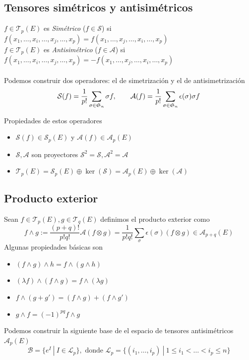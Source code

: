 \documentclass{myclass}
\newcommand{\T}{\mathcal{T}}
\newcommand{\A}{\mathcal{A}}
\renewcommand{\S}{\mathcal{S}}
\newcommand{\st}{\ | \ }
\renewcommand{\A}{\mathcal{A}}
\begin{document}
\subsection{Tensores simétricos y antisimétricos}
$f\in\T_p(E)$ es \textit{Simétrico} ($f\in \S$) si $f(x_1, \ldots, x_i, \ldots, x_j, \ldots, x_p) = f(x_1, \ldots, x_j, \ldots, x_i, \ldots, x_p)$ \\
$f\in\T_p(E)$ es \textit{Antisimétrico} ($f\in \A$) si $f(x_1, \ldots, x_i, \ldots, x_j, \ldots, x_p) = -f(x_1, \ldots, x_j, \ldots, x_i, \ldots, x_p)$ \\
\\
Podemos construir dos operadores: el de simetrización y el de antisimetrización
$$
\S(f) = \frac{1}{p!} \sum_{\sigma \in \frak{S}_n} \sigma f, \qquad \A(f) = \frac{1}{p!} \sum_{\sigma \in \frak{S}_n} \epsilon(\sigma)\sigma f
$$

Propiedades de estos operadores
\begin{itemize}
    \item $\S(f)\in \S_p(E)$ y $\A(f)\in \A_p(E)$
    \item $\S, \A$ son proyectores $\S^2=\S,  \A^2=\A$
    \item $\T_p(E)=\S_p(E)\oplus \ker(\S) = \A_p(E)\oplus \ker(\A)$
\end{itemize}

\subsection{Producto exterior}
Sean $f\in\T_p(E), g\in \T_q(E) $ definimos el producto exterior como
$$
f\wedge g := \frac{(p+q)!}{p!q!}\A(f\otimes g) = \frac{1}{p!q!}\sum_\sigma \epsilon(\sigma)(f\otimes g) \in \A_{p+q}(E)
$$
Algunas propiedades básicas son
\begin{itemize}
    \item $(f\wedge g)\wedge h=f\wedge(g\wedge h)$
    \item $(\lambda f)\wedge(f\wedge g) = f\wedge(\lambda g)$
    \item $f\wedge(g+g') = (f\wedge g) + (f\wedge g')$
    \item $g\wedge f = (-1)^{pq} f\wedge g$
\end{itemize}
Podemos construir la siguiente base de el espacio de tensores antisimétricos $\A_p(E)$
$$
\mathcal{B} = \{ e^I \st I\in \mathcal{L}_p \}, \text{ donde } \mathcal{L}_p = \{ (i_1, \dots, i_p) \st 1\leq i_1 < \ldots <i_p\leq n \}
$$
\end{document}
